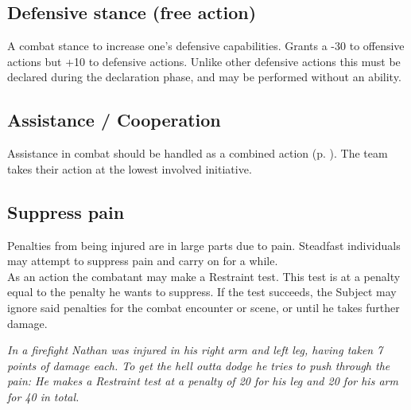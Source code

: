 \subsection*{Defensive stance (free action)}
A combat stance to increase one’s defensive capabilities.
Grants a -30 to offensive actions but +10 to defensive actions.
Unlike other defensive actions this must be declared during the declaration phase,
	and may be performed without an ability.
\subsection*{Assistance / Cooperation}
Assistance in combat should be handled as a combined action (p. \pageref{combinedaction}).
The team takes their action at the lowest involved initiative.
\subsection*{Suppress pain}
Penalties from being injured are in large parts due to pain. Steadfast individuals may attempt to suppress pain and carry on for a while.\\
As an action the combatant may make a Restraint test.
This test is at a penalty equal to the penalty he wants to suppress.
If the test succeeds,
	the Subject may ignore said penalties for the combat encounter or scene,
	or until he takes further damage.
\begin{exampleblock}
	\itshape
	In a firefight Nathan was injured in his right arm and left leg, having taken 7 points of damage each. To get the hell outta dodge he tries to push through the pain: He makes a \emph{Restraint} test at a penalty of 20 for his leg and 20 for his arm for 40 in total.
\end{exampleblock}